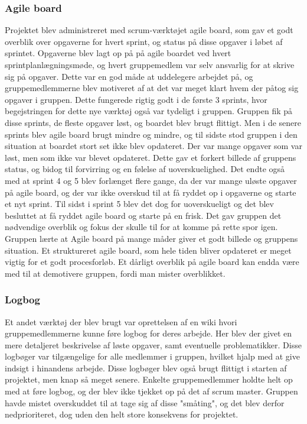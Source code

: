 \subsubsection{Agile board}
Projektet blev administreret med scrum-værktøjet agile board, som gav et godt overblik over opgaverne for hvert sprint, og status på disse opgaver
i løbet af sprintet. Opgaverne blev lagt op på på agile boardet ved hvert sprintplanlægningsmøde, og hvert gruppemedlem var selv ansvarlig for at skrive sig på
opgaver. Dette var en god måde at uddelegere arbejdet på, og gruppemedlemmerne blev motiveret af at det var meget klart hvem der påtog sig opgaver i gruppen.
Dette fungerede rigtig godt i de første 3 sprints, hvor begejstringen for dette nye værktøj også var tydeligt i gruppen. Gruppen fik på disse sprints, de 
fleste opgaver løst, og boardet blev brugt flittigt. Men i de senere sprints blev agile board brugt mindre og mindre, og til sidste stod gruppen i den situation
at boardet stort set ikke blev opdateret. Der var mange opgaver som var løst, men som ikke var blevet opdateret. Dette gav et forkert billede af 
gruppens status, og bidog til forvirring og en følelse af uoverskuelighed. Det endte også med at sprint 4 og 5 blev forlænget flere gange, da der var mange 
uløste opgaver på agile board, og der var ikke overskud til at få ryddet op i opgaverne og starte et nyt sprint. Til sidst i sprint 5 blev det dog for uoverskueligt
og det blev besluttet at få ryddet agile board og starte på en frisk. Det gav gruppen det nødvendige overblik og fokus der skulle til for at komme på rette
spor igen. Gruppen lærte at Agile board på mange måder giver et godt billede og gruppens situation. Et struktureret agile board, som hele tiden bliver opdateret 
er meget vigtig for et godt procesforløb. Et dårligt overblik på agile board kan endda være med til at demotivere gruppen, fordi man mister overblikket.  
 
\subsubsection{Logbog}
Et andet værktøj der blev brugt var oprettelsen af en wiki hvori gruppemedlemmerne kunne føre logbog for deres arbejde. Her blev der givet en mere detaljeret 
beskrivelse af løste opgaver, samt eventuelle problematikker. Disse logbøger var tilgængelige for alle medlemmer i gruppen, hvilket hjalp med at give indsigt i 
hinandens arbejde. Disse logbøger blev også brugt flittigt i starten af projektet, men knap så meget senere. Enkelte gruppemedlemmer holdte helt op med at 
føre logbog, og der blev ikke tjekket op på det af scrum master. Gruppen havde mistet overskuddet til at tage sig af disse "småting", og det blev derfor
nedprioriteret, dog uden den helt store konsekvens for projektet.

